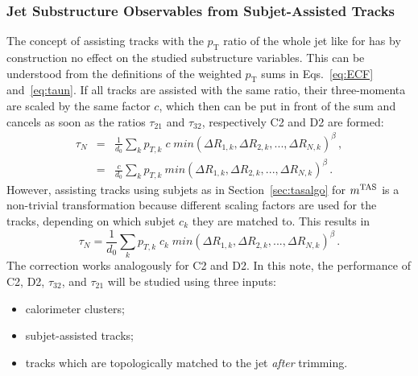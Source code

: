 \subsubsection{Jet Substructure Observables from Subjet-Assisted Tracks}
The concept of assisting tracks with the $p_{\mathrm{T}}$ ratio of the whole jet like for \mta has by construction no effect on the studied substructure variables. This can be understood from the definitions of the weighted $p_{\mathrm{T}}$ sums in Eqs.~\eqref{eq:ECF} and~\eqref{eq:taun}. If all tracks are assisted with the same ratio, their three-momenta are scaled by the same factor $c$, which then can be put in front of the sum and cancels as soon as the ratios $\tau_{21}$ and $\tau_{32}$, respectively C2 and D2 are formed:
\begin{equation}
\begin{aligned}
 \tau_N &=& \frac{1}{d_0}\sum_k p_{T,k} \; c \; min(\Delta R_{1,k},\Delta R_{2,k},...,\Delta R_{N,k})^{\beta}\,, \\
 &=& \frac{c}{d_0}\sum_k p_{T,k}\:min(\Delta R_{1,k},\Delta R_{2,k},...,\Delta R_{N,k})^{\beta}\,.
\end{aligned}
\end{equation}
However, assisting tracks using subjets as in Section~\ref{sec:tasalgo} for $m^\textrm{TAS}$ is a non-trivial transformation because different scaling factors are used for the tracks, depending on which subjet $c_k$ they are matched to. This results in 
\begin{equation}
\tau_N = \frac{1}{d_0}\sum_k p_{T,k} \; c_k \; min(\Delta R_{1,k},\Delta R_{2,k},...,\Delta R_{N,k})^{\beta}\,.
\end{equation}\label{eq:tas_ta}
The correction works analogously for C2 and D2. In this note, the performance of C2, D2, $\tau_{32}$, and $\tau_21$ will be studied using three inputs:
\begin{itemize}
\item
calorimeter clusters;
\item
subjet-assisted tracks;
\item
tracks which are topologically matched to the \larger jet {\em after} trimming.
\end{itemize}
